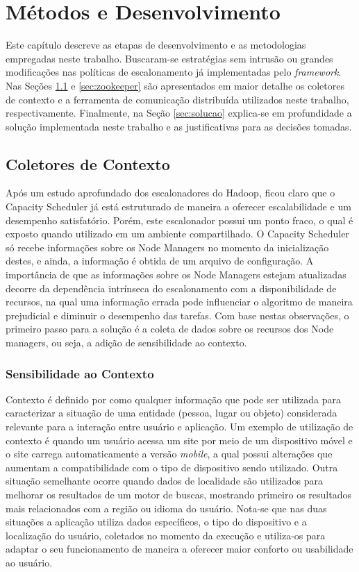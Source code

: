 \chapter{Métodos e Desenvolvimento}
\label{cap:desen}
Este capítulo descreve as etapas de desenvolvimento e as metodologias empregadas neste trabalho. Buscaram-se estratégias sem intrusão ou grandes modificações nas políticas de escalonamento já implementadas pelo \textit{framework}. Nas Seções \ref{sec:collector} e \ref{sec:zookeeper} são apresentados em maior detalhe os coletores de contexto e a ferramenta de comunicação distribuída utilizados neste trabalho, respectivamente. Finalmente, na Seção \ref{sec:solucao} explica-se em profundidade a solução implementada neste trabalho e as justificativas para as decisões tomadas.

\section{Coletores de Contexto}
\label{sec:collector}
Após um estudo aprofundado dos escalonadores do Hadoop, ficou claro que o Capacity Scheduler já está estruturado de maneira a oferecer escalabilidade e um desempenho satisfatório. Porém, este escalonador possui um ponto fraco, o qual é exposto quando utilizado em um ambiente compartilhado. O Capacity Scheduler só recebe informações sobre os Node Managers no momento da inicialização destes, e ainda, a informação é obtida de um arquivo de configuração. A importância de que as informações sobre os Node Managers estejam atualizadas decorre da dependência intrínseca do escalonamento com a disponibilidade de recursos, na qual uma informação errada pode influenciar o algoritmo de maneira prejudicial e diminuir o desempenho das tarefas. Com base nestas observações, o primeiro passo para a solução é a coleta de dados sobre os recursos dos Node managers, ou seja, a adição de sensibilidade ao contexto.

\subsection{Sensibilidade ao Contexto}
\label{sec:ctx}
Contexto é definido por \cite{Dey} como qualquer informação que pode ser utilizada para caracterizar a situação de uma entidade (pessoa, lugar ou objeto) considerada relevante para a interação entre usuário e aplicação. Um exemplo de utilização de contexto é quando um usuário acessa um site por meio de um dispositivo móvel e o site carrega automaticamente a versão \textit{mobile}, a qual possui alterações que aumentam a compatibilidade com o tipo de dispositivo sendo utilizado. Outra situação semelhante ocorre quando dados de localidade são utilizados para melhorar os resultados de um motor de buscas, mostrando primeiro os resultados mais relacionados com a região ou idioma do usuário. Nota-se que nas duas situações a aplicação utiliza dados específicos, o tipo do dispositivo e a localização do usuário, coletados no momento da execução e utiliza-os para adaptar o seu funcionamento de maneira a oferecer maior conforto ou usabilidade ao usuário. 

